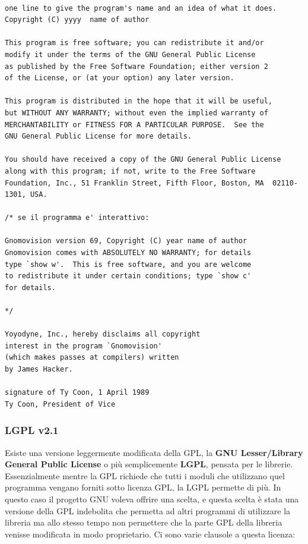 \begin{lstlisting}[caption=Licenza GPLv2]

one line to give the program's name and an idea of what it does.
Copyright (C) yyyy  name of author

This program is free software; you can redistribute it and/or
modify it under the terms of the GNU General Public License
as published by the Free Software Foundation; either version 2
of the License, or (at your option) any later version.

This program is distributed in the hope that it will be useful,
but WITHOUT ANY WARRANTY; without even the implied warranty of
MERCHANTABILITY or FITNESS FOR A PARTICULAR PURPOSE.  See the
GNU General Public License for more details.

You should have received a copy of the GNU General Public License
along with this program; if not, write to the Free Software
Foundation, Inc., 51 Franklin Street, Fifth Floor, Boston, MA  02110-1301, USA.

/* se il programma e' interattivo:

Gnomovision version 69, Copyright (C) year name of author
Gnomovision comes with ABSOLUTELY NO WARRANTY; for details
type `show w'.  This is free software, and you are welcome
to redistribute it under certain conditions; type `show c' 
for details.

*/

Yoyodyne, Inc., hereby disclaims all copyright
interest in the program `Gnomovision'
(which makes passes at compilers) written 
by James Hacker.

signature of Ty Coon, 1 April 1989
Ty Coon, President of Vice

\end{lstlisting}

\subsubsection{LGPL v2.1}

Esiste una versione leggermente modificata della GPL, la \textbf{GNU Lesser/Library General Public License} o più semplicemente \textbf{LGPL}, pensata per le librerie. Essenzialmente mentre la GPL richiede che tutti i moduli che utilizzano quel programma vengano forniti sotto licenza GPL, la LGPL permette di più. In questo caso il progetto GNU voleva offrire una scelta, e questa scelta è stata una versione della GPL indebolita che permetta ad altri programmi di utilizzare la libreria ma allo stesso tempo non permettere che la parte GPL della libreria venisse modificata in modo proprietario. Ci sono varie clausole a questa licenza:

